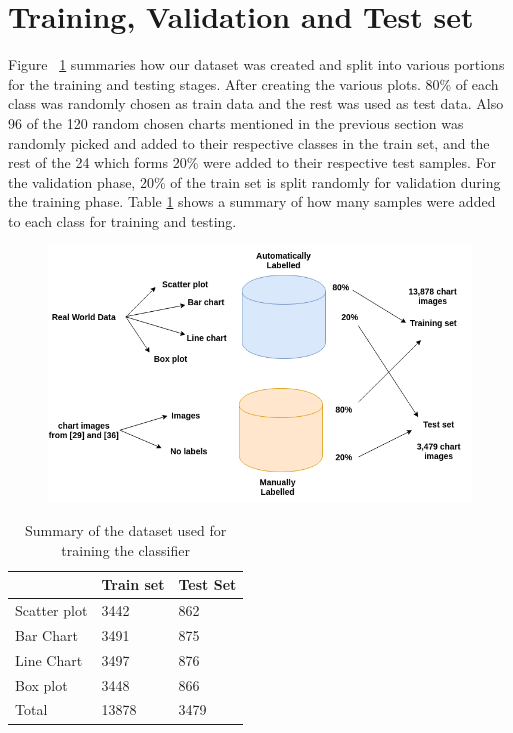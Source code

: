 \documentclass[12pt, a4paper,oneside]{report}
\begin{document}
\section{Training, Validation and Test set}
Figure ~\ref{fig:approach} summaries how our dataset was created and split into various portions for the training and testing stages. After creating the various plots. 80\% of each class was randomly chosen as train data and the rest was used as test data.
Also 96 of the 120 random chosen charts mentioned in the previous section was randomly picked and added to their respective classes in the train set, and the rest of the 24 which forms 20\% were added to their respective test samples.
For the validation phase, 20\% of the train set is split randomly for validation during the training phase. 
Table \ref{table:chart summary} shows a summary of how many samples were added to each class for training and testing.

\begin{figure}[!htbp]
	\includegraphics [scale=0.5] {approach}
	\label{fig:approach}
\end{figure}


\begin{table}[!htbp]
	\centering {} \small
	
	\begin{adjustbox}{max width=1.1\textwidth,center}
		\begin{tabular}{|p{5cm}|p{5cm}|p{5cm}|}
			\hline						
			&Train set&Test Set  \\ \hline	 
			Scatter plot & 3442 & 862  \\ \hline
			Bar Chart & 3491 & 875 \\ \hline
			Line Chart & 3497 & 876 \\ \hline
			Box plot & 3448 &  866\\ \hline	
			Total & 13878 &  3479 \\ \hline		
		\end{tabular}
		
	\end{adjustbox}
	\caption {Summary of the dataset used for training the classifier}	
	\label{table:chart summary}
\end{table}
\end{document}
